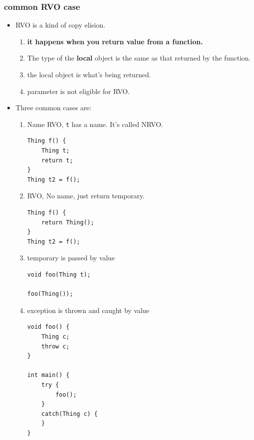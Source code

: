 \documentclass[a4paper,11pt,twoside]{book}
\begin{document}
\subsubsection{common RVO case}
\begin{itemize}
	\item RVO is a kind of copy elision. 
	\begin{enumerate}
		\item \textbf{it happens when you return value from a function.}
		\item The type of the \textbf{local} object is the same as that returned by the function.
		\item the local object is what's being returned.
		\item parameter is not eligible for RVO. 
	\end{enumerate}
	
	\item Three common cases are:
	\begin{enumerate}
		\item Name RVO, \texttt{t} has a name. It's called NRVO.
\begin{lstlisting}[numbers=none]
Thing f() {
	Thing t;
	return t;
}
Thing t2 = f();
\end{lstlisting}

		\item RVO, No name, just return temporary.
\begin{lstlisting}[numbers=none]
Thing f() {
	return Thing();
}
Thing t2 = f();
\end{lstlisting}

		\item temporary is passed by value
\begin{lstlisting}[numbers=none]
void foo(Thing t);

foo(Thing());
\end{lstlisting}

\item exception is thrown and caught by value
\begin{lstlisting}[numbers=none]
void foo() {
	Thing c;
	throw c;
}

int main() {
	try {
		foo();
	}
	catch(Thing c) {  
	}             
}
\end{lstlisting}

	\end{enumerate}

\end{itemize}
\end{document}
